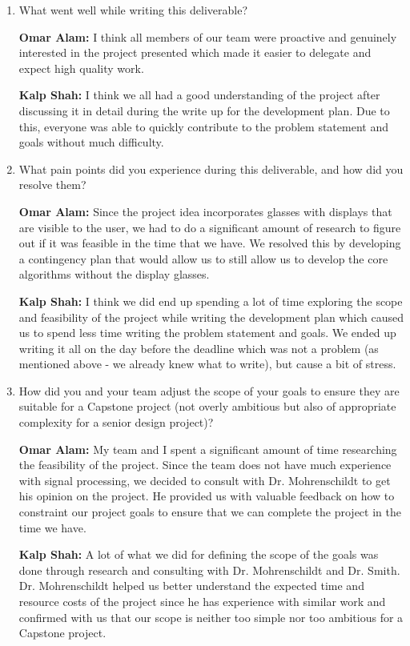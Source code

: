 \documentclass{article}
\begin{document}
\begin{enumerate}
    \item What went well while writing this deliverable? 
    
    \textbf{Omar Alam:} I think all members of our team were proactive and genuinely interested in the project presented which made it easier
    to delegate and expect high quality work. 
    
    \textbf{Kalp Shah:} I think we all had a good understanding of the project after discussing it in detail during
    the write up for the development plan. Due to this, everyone was able to quickly contribute to the problem statement
    and goals without much difficulty.


    \item What pain points did you experience during this deliverable, and how
    did you resolve them?

    \textbf{Omar Alam:} Since the project idea incorporates glasses with displays that are visible to the user, we had to do a significant amount
    of research to figure out if it was feasible in the time that we have. We resolved this by developing a contingency plan that would allow us to 
    still allow us to develop the core algorithms without the display glasses.
    
    \textbf{Kalp Shah:} I think we did end up spending a lot of time exploring the scope and feasibility of the project while writing the development
    plan which caused us to spend less time writing the problem statement and goals. We ended up writing it all on the day before the deadline which
    was not a problem (as mentioned above - we already knew what to write), but cause a bit of stress.


    \item How did you and your team adjust the scope of your goals to ensure
    they are suitable for a Capstone project (not overly ambitious but also of
    appropriate complexity for a senior design project)?

    \textbf{Omar Alam:} My team and I spent a significant amount of time researching the feasibility of the project. Since the team does not have much
    experience with signal processing, we decided to consult with Dr. Mohrenschildt to get his opinion on the project. He provided us with valuable feedback on how
    to constraint our project goals to ensure that we can complete the project in the time we have.
    
    \textbf{Kalp Shah:} A lot of what we did for defining the scope of the goals was done through research and consulting with Dr. Mohrenschildt and Dr. Smith.
    Dr. Mohrenschildt helped us better understand the expected time and resource costs of the project since he has experience with similar work and confirmed
    with us that our scope is neither too simple nor too ambitious for a Capstone project.
\end{enumerate}  



\end{document}
